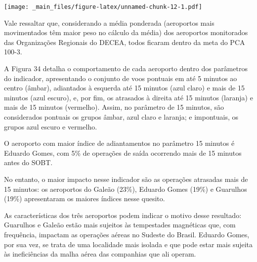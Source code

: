 \documentclass[
]{book}
\begin{document}
\texttt{[image: \_main\_files/figure-latex/unnamed-chunk-12-1.pdf]}

Vale ressaltar que, considerando a média ponderada (aeroportos mais movimentados têm maior peso no cálculo da média) dos aeroportos monitorados das Organizações Regionais do DECEA, todos ficaram dentro da meta do PCA 100-3.

A Figura 34 detalha o comportamento de cada aeroporto dentro dos parâmetros do indicador, apresentando o conjunto de voos pontuais em até 5 minutos ao centro (âmbar), adiantados à esquerda até 15 minutos (azul claro) e mais de 15 minutos (azul escuro), e, por fim, os atrasados à direita até 15 minutos (laranja) e mais de 15 minutos (vermelho). Assim, no parâmetro de 15 minutos, são considerados pontuais os grupos âmbar, azul claro e laranja; e impontuais, os grupos azul escuro e vermelho.

O aeroporto com maior índice de adiantamentos no parâmetro 15 minutos é Eduardo Gomes, com 5\% de operações de saída ocorrendo mais de 15 minutos antes do SOBT.

No entanto, o maior impacto nesse indicador são as operações atrasadas mais de 15 minutos: os aeroportos do Galeão (23\%), Eduardo Gomes (19\%) e Guarulhos (19\%) apresentaram os maiores índices nesse quesito.

As características dos três aeroportos podem indicar o motivo desse resultado: Guarulhos e Galeão estão mais sujeitos às tempestades magnéticas que, com frequência, impactam as operações aéreas no Sudeste do Brasil. Eduardo Gomes, por sua vez, se trata de uma localidade mais isolada e que pode estar mais sujeita às ineficiências da malha aérea das companhias que ali operam.
\end{document}
